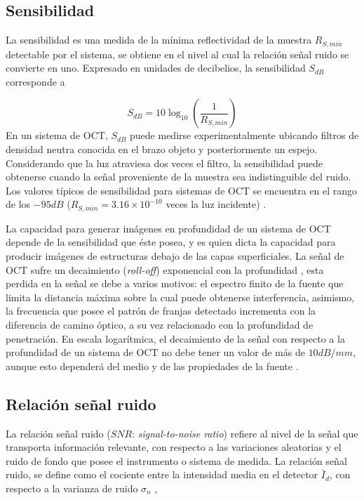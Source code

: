 \subsection{Sensibilidad}

La sensibilidad es una medida de la mínima reflectividad de la muestra  $R_{S, min}$ detectable por el sistema, se obtiene en el nivel al cual la relación señal ruido se convierte en uno. Expresado en unidades de decibelios, la sensibilidad $S_{dB}$ corresponde a \cite{Drexler2015}

\begin{equation}
S_{dB} = 10\log_{10} \left(\frac{1}{R_{S,min}}\right)
\end{equation}
En un sistema de OCT, $S_{dB}$ puede medirse experimentalmente ubicando filtros de densidad neutra conocida en el brazo objeto y posteriormente un espejo. Considerando que la luz atraviesa dos veces el filtro, la sensibilidad puede obtenerse cuando la señal proveniente de la muestra sea indistinguible del ruido. Los valores típicos de sensibilidad para sistemas de OCT se encuentra en el rango de los $-95dB$ ($R_{S, min}=3.16\times 10^{-10}$ veces la luz incidente) \cite{Drexler2015}. 

La capacidad para generar imágenes en profundidad de un sistema de OCT depende de la sensibilidad que éste posea, y es quien dicta la capacidad para producir imágenes de estructuras debajo de las capas superficiales. La señal de OCT sufre un decaimiento (\textit{roll-off}) exponencial con la profundidad \cite{Fercher2003, Drexler2015}, esta perdida en la señal se debe a varios motivos: el espectro finito de la fuente que limita la distancia máxima sobre la cual puede obtenerse interferencia, asimismo, la frecuencia que posee el patrón de franjas detectado incrementa con la diferencia de camino óptico, a su vez relacionado con la profundidad de penetración. En escala logarítmica, el decaimiento de la señal con respecto a la profundidad de un sistema de OCT no debe tener un valor de más de $10dB/mm$, aunque esto dependerá del medio y de las propiedades de la fuente \cite{Drexler2015}.

\subsection{Relación señal ruido}
\label{subsec:SNR}

La relación señal ruido ($SNR$: \textit{signal-to-noise ratio}) refiere al nivel de la señal que transporta información relevante, con respecto a las variaciones aleatorias y el ruido de fondo que posee el instrumento o sistema de medida. La relación señal ruido, se define como el cociente entre la intensidad media en el detector $\bar{I}_d$, con respecto a la varianza de ruido $\sigma_n$ \cite{Rollins1999_2},

